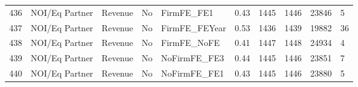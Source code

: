 \begin{table}[ht]
\begin{tabular}{rlllllllll}
  436 & NOI/Eq Partner & Revenue & No & FirmFE\_FE1 & 0.43 & 1445 & 1446 & 23846 & 5 \\ 
  437 & NOI/Eq Partner & Revenue & No & FirmFE\_FEYear & 0.53 & 1436 & 1439 & 19882 & 36 \\ 
  438 & NOI/Eq Partner & Revenue & No & FirmFE\_NoFE & 0.41 & 1447 & 1448 & 24934 & 4 \\ 
  439 & NOI/Eq Partner & Revenue & No & NoFirmFE\_FE3 & 0.44 & 1445 & 1446 & 23851 & 7 \\ 
  440 & NOI/Eq Partner & Revenue & No & NoFirmFE\_FE1 & 0.43 & 1445 & 1446 & 23880 & 5 \\ 
   \hline
\end{tabular}
\end{table}
